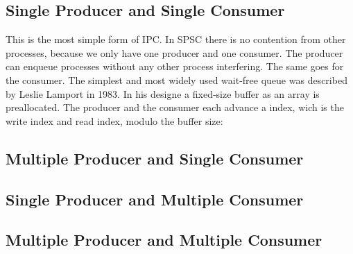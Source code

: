 \subsection{Single Producer and Single Consumer}\label{sec:single-producer-and-single-consumer}
This is the most simple form of \ac{IPC}. In \ac{SPSC} there is no contention from other processes, because we only have one producer and one consumer. The producer can enqueue processes without any other process interfering. The same goes for the consumer. The simplest and most widely used wait-free queue was described by Leslie Lamport in 1983. In his designe a fixed-size buffer as an array is preallocated. The producer and the consumer each advance a index, wich is the write index and read index, modulo the buffer size: 

\subsection{Multiple Producer and Single Consumer}\label{sec:multiple-producer-and-single-consumer}

\subsection{Single Producer and Multiple Consumer}\label{sec:single-producer-and-multiple-consumer}

\subsection{Multiple Producer and Multiple Consumer}\label{sec:multiple-producer-and-multiple-consumer}